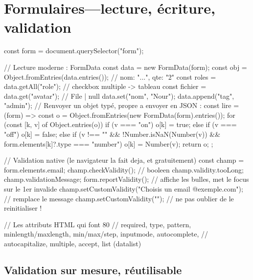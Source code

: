 \section{Formulaires---lecture, \'ecriture, validation}

\begin{codejs}
const form = document.querySelector("form");

// Lecture moderne : FormData
const data = new FormData(form);
const obj = Object.fromEntries(data.entries());           // { nom: "...", qte: "2" }
const roles = data.getAll("role");                         // checkbox multiple -> tableau
const fichier = data.get("avatar");                        // File | null
data.set("nom", "Nour"); data.append("tag", "admin");
// Renvoyer un objet typ\'e, propre a envoyer en JSON :
const lire = (form) => {
  const o = Object.fromEntries(new FormData(form).entries());
  for (const [k, v] of Object.entries(o)) {
    if (v === "on") o[k] = true;
    else if (v === "off") o[k] = false;
    else if (v !== "" && !Number.isNaN(Number(v)) && form.elements[k]?.type === "number") o[k] = Number(v);
  }
  return o;
};

// Validation native (le navigateur la fait deja, et gratuitement)
const champ = form.elements.email;
champ.checkValidity();          // booleen
champ.validity.tooLong; champ.validationMessage;
form.reportValidity();          // affiche les bulles, met le focus sur le 1er invalide
champ.setCustomValidity("Choisis un email @exemple.com");   // remplace le message
champ.setCustomValidity("");     // ne pas oublier de le reinitialiser !

// Les attributs HTML qui font 80 %
// required, type, pattern, minlength/maxlength, min/max/step, inputmode, autocomplete,
// autocapitalize, multiple, accept, list (datalist)
\end{codejs}

\subsection{Validation sur mesure, r\'eutilisable}

